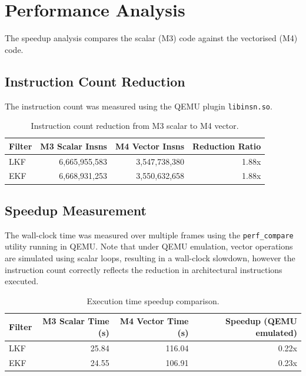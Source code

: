 \documentclass{article}
\begin{document}
\section{Performance Analysis}
The speedup analysis compares the scalar (M3) code against the vectorised (M4) code.

\subsection{Instruction Count Reduction}
The instruction count was measured using the QEMU plugin \texttt{libinsn.so}.

\begin{table}[ht]
\centering
\begin{tabular}{|l|r|r|r|}
\hline
Filter & M3 Scalar Insns & M4 Vector Insns & Reduction Ratio \\
\hline
LKF & 6,665,955,583 & 3,547,738,380 & 1.88x \\
EKF & 6,668,931,253 & 3,550,632,658 & 1.88x \\
\hline
\end{tabular}
\caption{Instruction count reduction from M3 scalar to M4 vector.}
\end{table}

\subsection{Speedup Measurement}
The wall-clock time was measured over multiple frames using the \texttt{perf\_compare} utility running in QEMU. Note that under QEMU emulation, vector operations are simulated using scalar loops, resulting in a wall-clock slowdown, however the instruction count correctly reflects the reduction in architectural instructions executed.

\begin{table}[ht]
\centering
\begin{tabular}{|l|r|r|r|}
\hline
Filter & M3 Scalar Time (s) & M4 Vector Time (s) & Speedup (QEMU emulated) \\
\hline
LKF & 25.84 & 116.04 & 0.22x \\
EKF & 24.55 & 106.91 & 0.23x \\
\hline
\end{tabular}
\caption{Execution time speedup comparison.}
\end{table}
\end{document}
